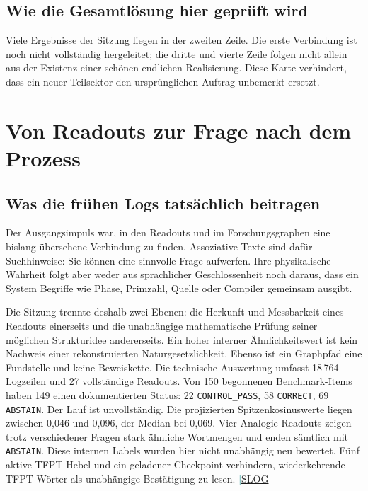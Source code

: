 \documentclass[11pt,a4paper,oneside,parskip=half,headings=normal,numbers=noenddot,bibliography=totoc]{scrreprt}
\newcommand{\src}[1]{\textcolor{teal}{\small[\hyperref[s:#1]{S#1}]}}
\begin{document}
\section{Wie die Gesamtlösung hier geprüft wird}
\begin{center}
\end{center}
Viele Ergebnisse der Sitzung liegen in der zweiten Zeile. Die erste Verbindung ist noch nicht vollständig hergeleitet; die dritte und vierte Zeile folgen nicht allein aus der Existenz einer schönen endlichen Realisierung. Diese Karte verhindert, dass ein neuer Teilsektor den ursprünglichen Auftrag unbemerkt ersetzt.

\chapter{Von Readouts zur Frage nach dem Prozess}
\section{Was die frühen Logs tatsächlich beitragen}
Der Ausgangsimpuls war, in den Readouts und im Forschungsgraphen eine bislang übersehene Verbindung zu finden. Assoziative Texte sind dafür Suchhinweise: Sie können eine sinnvolle Frage aufwerfen. Ihre physikalische Wahrheit folgt aber weder aus sprachlicher Geschlossenheit noch daraus, dass ein System Begriffe wie Phase, Primzahl, Quelle oder Compiler gemeinsam ausgibt.

Die Sitzung trennte deshalb zwei Ebenen: die Herkunft und Messbarkeit eines Readouts einerseits und die unabhängige mathematische Prüfung seiner möglichen Strukturidee andererseits. Ein hoher interner Ähnlichkeitswert ist kein Nachweis einer rekonstruierten Naturgesetzlichkeit. Ebenso ist ein Graphpfad eine Fundstelle und keine Beweiskette. Die technische Auswertung umfasst 18\,764 Logzeilen und 27 vollständige Readouts. Von 150 begonnenen Benchmark-Items haben 149 einen dokumentierten Status: 22 \texttt{CONTROL\_PASS}, 58 \texttt{CORRECT}, 69 \texttt{ABSTAIN}. Der Lauf ist unvollständig. Die projizierten Spitzenkosinuswerte liegen zwischen 0,046 und 0,096, der Median bei 0,069. Vier Analogie-Readouts zeigen trotz verschiedener Fragen stark ähnliche Wortmengen und enden sämtlich mit \texttt{ABSTAIN}. Diese internen Labels wurden hier nicht unabhängig neu bewertet. Fünf aktive TFPT-Hebel und ein geladener Checkpoint verhindern, wiederkehrende TFPT-Wörter als unabhängige Bestätigung zu lesen. \src{LOG}
\end{document}
